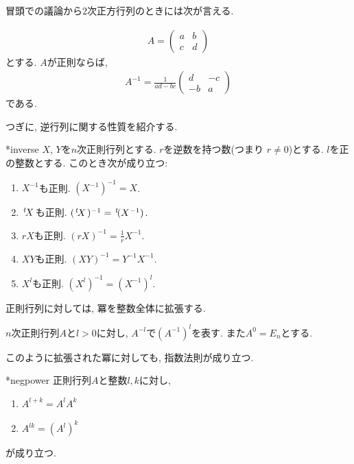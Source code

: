 冒頭での議論から$2$次正方行列のときには次が言える.
\begin{theorem}
  \begin{align*}
    A=
  \begin{pmatrix}
    a&b\\c&d
  \end{pmatrix}
  \end{align*}
  とする.  $A$が正則ならば,
  \begin{align*}
    A^{-1}=
    \frac{1}{ad-bc}
    \begin{pmatrix}
      d&-c\\-b&a
    \end{pmatrix}
  \end{align*}
  である.
\end{theorem}

つぎに,
逆行列に関する性質を紹介する.
\begin{proposition}
  \provelater**{inverse}
  \label{thm:inverse:operation}
  $X$, $Y$を$n$次正則行列とする.
  $r$を逆数を持つ数(つまり $r\neq 0$)とする.
  $l$を正の整数とする.
  このとき次が成り立つ:
  \begin{enumerate}
  \item{}
    $X^{-1}$も正則. $(X^{-1})^{-1}=X$.
  \item{}
    ${\left.^{t}\!X\right.}$も正則. $({\left.^{t}\!X\right.})^{-1}={\left.^{t}\!(X^{-1})\right.}$.
  \item{}
    $rX$も正則. $(rX)^{-1}=\frac{1}{r}X^{-1}$.
  \item{}
    $XY$も正則. $(XY)^{-1}=Y^{-1}X^{-1}$.
  \item{}
    $X^l$も正則. $(X^l)^{-1}=(X^{-1})^l$.
  \end{enumerate}
\end{proposition}


正則行列に対しては,
冪を整数全体に拡張する.
\begin{definition}
  $n$次正則行列$A$と$l>0$に対し,
  $A^{-l}$で$(A^{-1})^l$を表す.
  また$A^{0}=E_n$とする.
\end{definition}
このように拡張された冪に対しても,
指数法則が成り立つ.
\begin{prop}
  \provelater**{negpower}
  正則行列$A$と整数$l,k$に対し,
  \begin{enumerate}
  \item{}
    $A^{l+k}=A^lA^k$
  \item{}
    $A^{lk}=(A^l)^k$
  \end{enumerate}
が成り立つ.
\end{prop}

